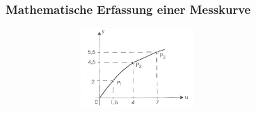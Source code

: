 	\subsubsection{Mathematische Erfassung einer Messkurve }

	\begin{floatingfigure}[r]{12cm}
    \includegraphics[width=10cm,height=3cm]{./bilder/KennlinieMitStuetzwerten.jpg}
	\end{floatingfigure}
   	
